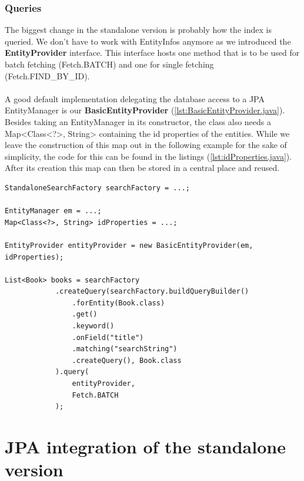 \subsubsection{Queries} \label{querying_standalone}
The biggest change in the standalone version is probably how the index is queried. We don't have to work with EntityInfos anymore as we introduced the \textbf{EntityProvider} interface. This interface hosts one method that is to be used for batch fetching (Fetch.BATCH) and one for single fetching (Fetch.FIND\_BY\_ID).
\\\\
A good default implementation delegating the database access to a JPA EntityManager is our \textbf{BasicEntityProvider} (\ref{lst:BasicEntityProvider.java}). Besides taking an EntityManager in its constructor, the class also needs a Map<Class<?>, String> containing the id properties of the entities. While we leave the construction of this map out in the following example for the sake of simplicity, the code for this can be found in the listings (\ref{lst:idProperties.java}). After its creation this map can then be stored in a central place and reused.
\\
\lstset{language=java}
\begin{lstlisting}[frame=htrbl, caption={Querying the index with the standalone version}, label={lst:querying_natively.java}]
StandaloneSearchFactory searchFactory = ...;

EntityManager em = ...;
Map<Class<?>, String> idProperties = ...;

EntityProvider entityProvider = new BasicEntityProvider(em, idProperties);

List<Book> books = searchFactory
			.createQuery(searchFactory.buildQueryBuilder()
				.forEntity(Book.class)
				.get()
				.keyword()
				.onField("title")
				.matching("searchString")
				.createQuery(), Book.class
			).query(
				entityProvider,
				Fetch.BATCH
			);
\end{lstlisting}

\pagebreak

\section{JPA integration of the standalone version} \label{integration_jpa}

